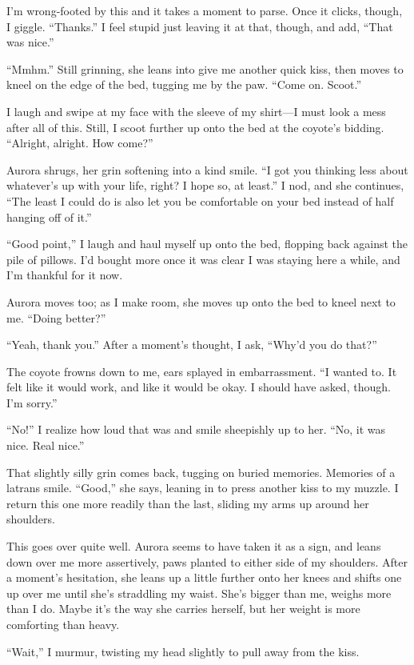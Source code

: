 I'm wrong-footed by this and it takes a moment to parse. Once it clicks, though, I giggle. ``Thanks.'' I feel stupid just leaving it at that, though, and add, ``That was nice.''

``Mmhm.'' Still grinning, she leans into give me another quick kiss, then moves to kneel on the edge of the bed, tugging me by the paw. ``Come on. Scoot.''

I laugh and swipe at my face with the sleeve of my shirt---I must look a mess after all of this. Still, I scoot further up onto the bed at the coyote's bidding. ``Alright, alright. How come?''

Aurora shrugs, her grin softening into a kind smile. ``I got you thinking less about whatever's up with your life, right? I hope so, at least.'' I nod, and she continues, ``The least I could do is also let you be comfortable on your bed instead of half hanging off of it.''

``Good point,'' I laugh and haul myself up onto the bed, flopping back against the pile of pillows. I'd bought more once it was clear I was staying here a while, and I'm thankful for it now.

Aurora moves too; as I make room, she moves up onto the bed to kneel next to me. ``Doing better?''

``Yeah, thank you.'' After a moment's thought, I ask, ``Why'd you do that?''

The coyote frowns down to me, ears splayed in embarrassment. ``I wanted to. It felt like it would work, and like it would be okay. I should have asked, though. I'm sorry.''

``No!'' I realize how loud that was and smile sheepishly up to her. ``No, it was nice. Real nice.''

That slightly silly grin comes back, tugging on buried memories. Memories of a latrans smile. ``Good,'' she says, leaning in to press another kiss to my muzzle. I return this one more readily than the last, sliding my arms up around her shoulders.

This goes over quite well. Aurora seems to have taken it as a sign, and leans down over me more assertively, paws planted to either side of my shoulders. After a moment's hesitation, she leans up a little further onto her knees and shifts one up over me until she's straddling my waist. She's bigger than me, weighs more than I do. Maybe it's the way she carries herself, but her weight is more comforting than heavy.

``Wait,'' I murmur, twisting my head slightly to pull away from the kiss.

